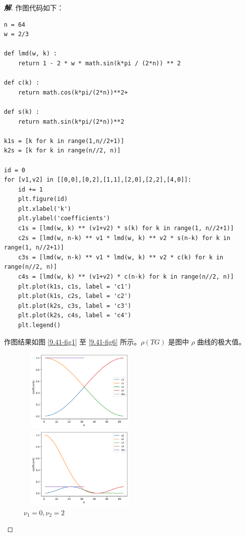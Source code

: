 \documentclass{ctexart}
\newenvironment{sol}{\begin{proof}[\bf 解]}{\end{proof}}
\begin{document}
\begin{sol}
作图代码如下：

\begin{lstlisting}
n = 64
w = 2/3

def lmd(w, k) :
    return 1 - 2 * w * math.sin(k*pi / (2*n)) ** 2

def c(k) :
    return math.cos(k*pi/(2*n))**2+

def s(k) :
    return math.sin(k*pi/(2*n))**2

k1s = [k for k in range(1,n//2+1)]
k2s = [k for k in range(n//2, n)]

id = 0
for [v1,v2] in [[0,0],[0,2],[1,1],[2,0],[2,2],[4,0]]:
    id += 1
    plt.figure(id)
    plt.xlabel('k')
    plt.ylabel('coefficients')
    c1s = [lmd(w, k) ** (v1+v2) * s(k) for k in range(1, n//2+1)]
    c2s = [lmd(w, n-k) ** v1 * lmd(w, k) ** v2 * s(n-k) for k in range(1, n//2+1)]
    c3s = [lmd(w, n-k) ** v1 * lmd(w, k) ** v2 * c(k) for k in range(n//2, n)]
    c4s = [lmd(w, k) ** (v1+v2) * c(n-k) for k in range(n//2, n)]
    plt.plot(k1s, c1s, label = 'c1')
    plt.plot(k1s, c2s, label = 'c2')
    plt.plot(k2s, c3s, label = 'c3')
    plt.plot(k2s, c4s, label = 'c4')
    plt.legend()
\end{lstlisting}

作图结果如图 \ref{9.41-fig1} 至 \ref{9.41-fig6} 所示。$\rho(TG)$ 是图中 $\rho$ 曲线的极大值。

\begin{figure}[htbp]
    \begin{minipage}{6cm}
        \centering
        \includegraphics[width = 6cm, height = 4cm]{41-1.png}
        \caption{$\nu_1=0,\nu_2=0$}
        \label{9.41-fig1}
    \end{minipage}
    \qquad
    \begin{minipage}{6cm}
        \centering
        \includegraphics[width = 6cm, height = 4cm]{41-2.png}
        \caption{$\nu_1=0,\nu_2=2$}
        \label{9.41-fig2}
    \end{minipage}


\end{figure}
\end{sol}
\end{document}
